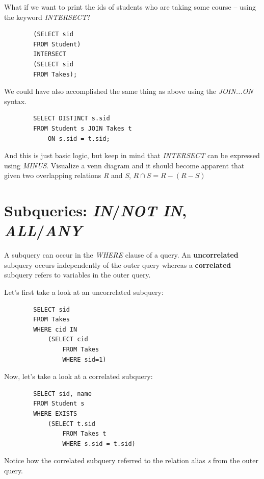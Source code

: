 \documentclass{article}
\begin{document}
What if we want to print the ids of students who are taking some course -- using the keyword \textit{INTERSECT}?

\begin{tcolorbox}
    \begin{verbatim}
        (SELECT sid
        FROM Student)
        INTERSECT
        (SELECT sid
        FROM Takes);
    \end{verbatim}
\end{tcolorbox}

We could have also accomplished the same thing as above using the \textit{JOIN...ON} syntax. 

\begin{tcolorbox}
    \begin{verbatim}
        SELECT DISTINCT s.sid
        FROM Student s JOIN Takes t
            ON s.sid = t.sid;
    \end{verbatim}
\end{tcolorbox}

And this is just basic logic, but keep in mind that \textit{INTERSECT} can be expressed using \textit{MINUS}. Visualize a venn diagram and it should become apparent that given two overlapping relations \textit{R} and \textit{S}, $R \cap S = R - (R - S)$

\section*{Subqueries: \textit{IN}/\textit{NOT IN}, \textit{ALL}/\textit{ANY}}

A subquery can occur in the \textit{WHERE} clause of a query. An \textbf{uncorrelated} subquery occurs independently of the outer query whereas a \textbf{correlated} subquery refers to variables in the outer query. 

Let's first take a look at an uncorrelated subquery:

\begin{tcolorbox}
    \begin{verbatim}
        SELECT sid
        FROM Takes
        WHERE cid IN
            (SELECT cid
                FROM Takes
                WHERE sid=1)
    \end{verbatim}
\end{tcolorbox}

Now, let's take a look at a correlated subquery:

\begin{tcolorbox}
    \begin{verbatim}
        SELECT sid, name
        FROM Student s
        WHERE EXISTS
            (SELECT t.sid
                FROM Takes t
                WHERE s.sid = t.sid)
    \end{verbatim}
\end{tcolorbox}
Notice how the correlated subquery referred to the relation alias \textit{s} from the outer query.
\end{document}
